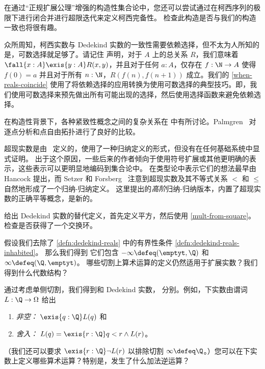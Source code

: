 在通过“正规扩展公理”增强的构造性集合论中，您还可以尝试通过在柯西序列的极限下进行闭合并进行超限迭代来定义柯西完备性。
检查此构造是否与我们的构造一致也将很有趣。

众所周知，柯西实数与 Dedekind 实数的一致性需要依赖选择，但不太为人所知的是，可数选择就足够了。请记住
%
%
%
声明，对于 $A$ 上的总关系 $R$，我们意味着 $\fall{x : A} \exis{y : A} R(x,y)$，并且对于任何 $a : A$，仅存在 $f : \N \to A$ 使得 $f(0) = a$ 并且对于所有 $n : \N$，$R(f(n), f(n+1))$ 成立。我们的 \cref{when-reals-coincide} 使用了将依赖选择的应用转换为使用可数选择的典型技巧。即，我们使用可数选择来预先做出所有可能出现的选择，然后使用选择函数来避免依赖选择。

在构造性背景下，各种紧致性概念之间的复杂关系在 \cite{bridges2002compactness} 中有所讨论。Palmgren~\cite{Palmgren:FT} 对逐点分析和点自由拓扑进行了良好的比较。

超现实数是由~\cite{conway:onag} 定义的，使用了一种归纳定义的形式，但没有在任何基础系统中显式证明。
出于这个原因，一些后来的作者倾向于使用符号扩展或其他更明确的表示，这些表示可以更明显地编码到集合论中。
在类型论中表示它们的想法最早由 Hancock 提出，而
Setzer 和 Forsberg~\cite{forsbergfinite} 注意到超现实数及其不等式关系 $<$ 和 $\le$ 自然地形成了一个归纳-归纳定义。
这里提出的\emph{高阶}归纳-归纳版本，内置了超现实数的正确平等概念，是新的。

\sectionExercises

\begin{ex}\label{ex:alt-dedekind-reals}
给出 Dedekind 实数的替代定义，首先定义平方，然后使用 \cref{mult-from-square}。
检查是否获得了一个交换环。
\end{ex}

\begin{ex} \label{ex:RD-extended-reals}
%
假设我们去除了 \cref{defn:dedekind-reals} 中的有界性条件 \ref{defn:dedekind-reals-inhabited}。
那么我们得到
%
%
它们包含 $-\infty \defeq
(\emptyt, \Q)$ 和 $\infty \defeq (\Q, \emptyt)$。 哪些切割上算术运算的定义仍然适用于扩展实数？我们得到什么代数结构？
\end{ex}

\begin{ex} \label{ex:RD-lower-cuts}
%
通过考虑单侧切割，我们得到和 Dedekind 实数，
%
%
%
%
%
分别。例如，下实数由谓词 $L : \Q \to \Omega$ 给出
%
\begin{enumerate}
  \item \emph{非空：} $\exis{q : \Q} L(q)$ 和
  \item \emph{舍入：} $L(q) = \exis{r : \Q} q < r \land L(r)$。
\end{enumerate}
%
（我们还可以要求 $\exis{r : \Q} \lnot L(r)$ 以排除切割 $\infty \defeq
\Q$。）您可以在下实数上定义哪些算术运算？特别是，发生了什么加法逆运算？
\end{ex}

